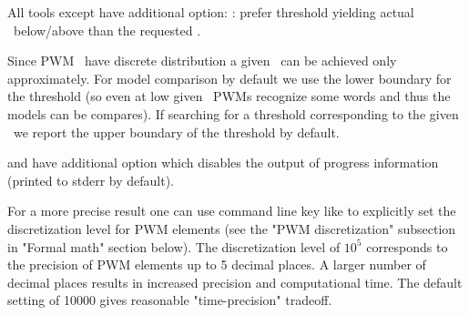 All tools except  have additional option:
: prefer threshold yielding actual \pvalue\ below/above than 
the requested \pvalue.

Since PWM \pvalues\ have discrete distribution a given \pvalue\ can be achieved only 
approximately. For model comparison by default we use the lower boundary for the threshold 
(so even at low given \pvalues\ PWMs recognize some words and thus the models can be 
compares). If searching for a threshold corresponding to the given \pvalue\ we report the upper 
boundary of the threshold by default.

 and  have additional option  which 
disables the output of progress information (printed to stderr by default).





For a more precise result one can use  command line key like  to explicitly set
the discretization level for PWM elements (see the "PWM discretization" subsection in "Formal math" section below).
The discretization level of $10^5$ corresponds to the precision of PWM elements up to
5 decimal places. A larger number of decimal places results in increased precision and
computational time. The default setting of 10000 gives reasonable "time-precision" tradeoff.
